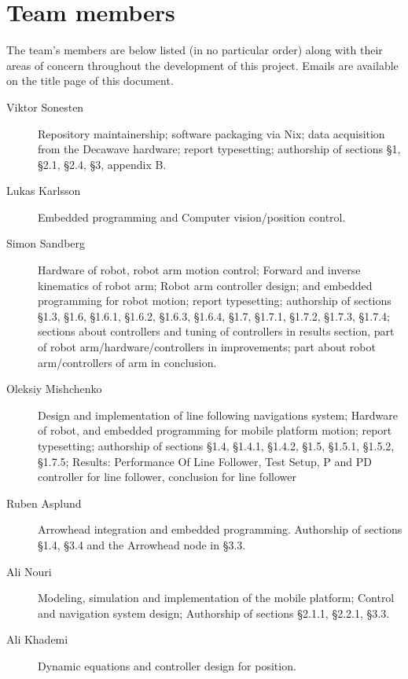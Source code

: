 \section{Team members}
The team's members are below listed (in no particular order) along with their areas of concern throughout the development of this project.
Emails are available on the title page of this document.

\begin{description}
\item[Viktor Sonesten] Repository maintainership; software packaging
  via Nix; data acquisition from the Decawave hardware; report
  typesetting; authorship of sections §1, §2.1, §2.4, §3, appendix B.

    \item[Lukas Karlsson]
    Embedded programming and
    Computer vision/position control.

    \item[Simon Sandberg]
    Hardware of robot, robot arm motion control;
    Forward and inverse kinematics of robot arm;
    Robot arm controller design;
    and embedded programming for robot motion; report
    typesetting; authorship of sections §1.3, §1.6, §1.6.1, §1.6.2, §1.6.3, §1.6.4, §1.7, §1.7.1, §1.7.2, §1.7.3, §1.7.4;
    sections about controllers and tuning of controllers in results section, part of robot arm/hardware/controllers in improvements;
    part about robot arm/controllers of arm in conclusion.

    \item[Oleksiy Mishchenko]
    Design and implementation of line following navigations system;
    Hardware of robot, and embedded programming for mobile platform motion; report
     typesetting; authorship of sections §1.4, §1.4.1, §1.4.2, §1.5, §1.5.1, §1.5.2, §1.7.5;
     Results: Performance Of Line Follower, Test Setup, P and PD controller for line follower, conclusion for line follower

    \item[Ruben Asplund]
    Arrowhead integration and embedded programming.
    Authorship of sections §1.4, §3.4 and the Arrowhead node in §3.3.

    \item[Ali Nouri]
    Modeling, simulation and implementation of the mobile platform;
    Control and navigation system design;
    Authorship of sections §2.1.1, §2.2.1, §3.3.

    \item[Ali Khademi]
    Dynamic equations and controller design for position.
\end{description}
